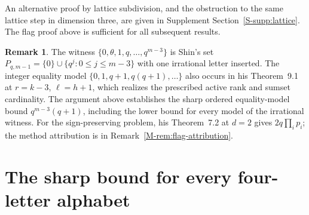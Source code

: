 \documentclass[11pt,reqno]{amsart}
\theoremstyle{plain}
\theoremstyle{definition}
\newtheorem{remark}[theorem]{Remark}
\theoremstyle{plain}
\theoremstyle{plain}
\theoremstyle{plain}
\theoremstyle{plain}
\theoremstyle{plain}
\theoremstyle{plain}
\theoremstyle{definition}
\theoremstyle{definition}
\theoremstyle{definition}
\theoremstyle{plain}
\begin{document}
An alternative proof by lattice subdivision, and the obstruction to
the same lattice step in dimension three, are given in
Supplement Section~\ref{S-supp:lattice}. The flag proof above is
sufficient for all subsequent results.

\begin{remark}\label{M-rem:corank-attribution}
The witness $\{0,\theta,1,q,\ldots,q^{m-3}\}$ is Shin's set
$P_{q,m-1}=\{0\}\cup\{q^j:0\le j\le m-3\}$ \cite[Corollary~7.3]{M-Shin26} with one
irrational letter inserted. The integer equality model
$\{0,1,q+1,q(q+1),\ldots\}$ also occurs in his Theorem~9.1 at $r=k-3$,
$\ell=h+1$, which realizes the prescribed active rank and sumset cardinality.
The argument above establishes the sharp ordered equality-model bound
$q^{m-3}(q+1)$, including the lower bound for every model of the irrational
witness. For the sign-preserving problem, his Theorem~7.2 at $d=2$ gives
$2q\prod_ip_i$; the method attribution is in
Remark~\ref{M-rem:flag-attribution}.
\end{remark}

\section{The sharp bound for every four-letter alphabet}\label{M-sec:four}
\end{document}
